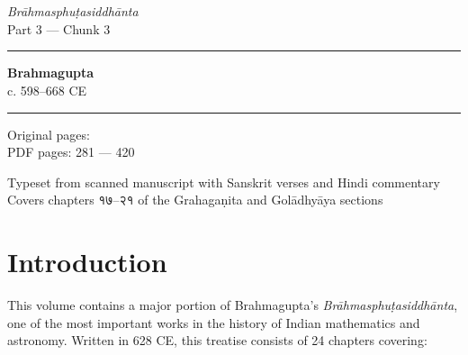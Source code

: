 \documentclass[11pt,a4paper]{article}
\newcommand{\shortline}{\noindent\rule{0.5\textwidth}{0.4pt}\par}
\begin{document}
\begin{titlepage}
\centering
\vspace*{2cm}

{\Huge\bfseries\color{titlecolor}}\\[0.8cm]
{\LARGE\bfseries\color{sectioncolor}}\\[1.5cm]

{\large\textit{Brāhmasphuṭasiddhānta}}\\[0.3cm]
{\large Part 3 — Chunk 3}\\[2cm]

\shortline

{\Large\textbf{Brahmagupta}}\\[0.5cm]
{\large c. 598–668 CE}\\[2cm]

\shortline

{\large Original pages: }\\[0.3cm]
{\large PDF pages: 281 — 420}\\[2cm]

\vfill

{\small Typeset from scanned manuscript with Sanskrit verses and Hindi commentary}\\[0.3cm]
{\small Covers chapters १७–२१ of the Grahagaṇita and Golādhyāya sections}

\end{titlepage}

\newpage

\section*{Introduction}

This volume contains a major portion of Brahmagupta's \textit{Brāhmasphuṭasiddhānta}, one of the most important works in the history of Indian mathematics and astronomy. Written in 628 CE, this treatise consists of 24 chapters covering:
\end{document}
